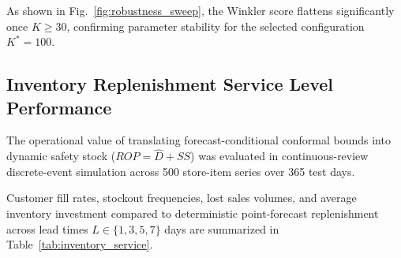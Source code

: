 As shown in Fig.~\ref{fig:robustness_sweep}, the Winkler score flattens significantly once $K \ge 30$, confirming parameter stability for the selected configuration $K^*=100$.

\subsection{Inventory Replenishment Service Level Performance}
The operational value of translating forecast-conditional conformal bounds into dynamic safety stock ($ROP = \hat{D} + SS$) was evaluated in continuous-review discrete-event simulation across 500 store-item series over 365 test days.

Customer fill rates, stockout frequencies, lost sales volumes, and average inventory investment compared to deterministic point-forecast replenishment across lead times $L \in \{1, 3, 5, 7\}$ days are summarized in Table~\ref{tab:inventory_service}.

